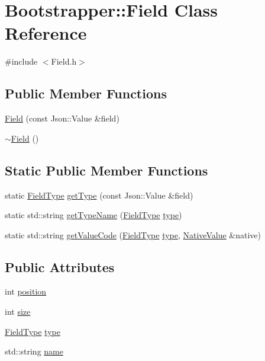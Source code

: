\hypertarget{classBootstrapper_1_1Field}{}\section{Bootstrapper\+:\+:Field Class Reference}
\label{classBootstrapper_1_1Field}


{\ttfamily \#include $<$Field.\+h$>$}

\subsection*{Public Member Functions}
\begin{DoxyCompactItemize}
\item 
\hyperlink{classBootstrapper_1_1Field_abd088815820d4e09209371878fcdb5b9}{Field} (const Json\+::\+Value \&field)
\item 
\hyperlink{classBootstrapper_1_1Field_a0f82fdaf05566ab8553b76fd8b5f81b1}{$\sim$\+Field} ()
\end{DoxyCompactItemize}
\subsection*{Static Public Member Functions}
\begin{DoxyCompactItemize}
\item 
static \hyperlink{namespaceBootstrapper_abb268c54c14e352b0204f5f0f928955f}{Field\+Type} \hyperlink{classBootstrapper_1_1Field_a3645ec61d64aad4f836ab87ce55d7fce}{get\+Type} (const Json\+::\+Value \&field)
\item 
static std\+::string \hyperlink{classBootstrapper_1_1Field_ab88f0ac745d4aca91713f46d669a3e2c}{get\+Type\+Name} (\hyperlink{namespaceBootstrapper_abb268c54c14e352b0204f5f0f928955f}{Field\+Type} \hyperlink{classBootstrapper_1_1Field_a3b51be0dcd155bb84173f1a73596d963}{type})
\item 
static std\+::string \hyperlink{classBootstrapper_1_1Field_a95c450dfe9ecedd662bdf07c6ed1d2d8}{get\+Value\+Code} (\hyperlink{namespaceBootstrapper_abb268c54c14e352b0204f5f0f928955f}{Field\+Type} \hyperlink{classBootstrapper_1_1Field_a3b51be0dcd155bb84173f1a73596d963}{type}, \hyperlink{unionNativeValue}{Native\+Value} \&native)
\end{DoxyCompactItemize}
\subsection*{Public Attributes}
\begin{DoxyCompactItemize}
\item 
int \hyperlink{classBootstrapper_1_1Field_a0c0b21db786e8e7463906fb18466f119}{position}
\item 
int \hyperlink{classBootstrapper_1_1Field_af0d0093eaaf445b55a91f12b33174442}{size}
\item 
\hyperlink{namespaceBootstrapper_abb268c54c14e352b0204f5f0f928955f}{Field\+Type} \hyperlink{classBootstrapper_1_1Field_a3b51be0dcd155bb84173f1a73596d963}{type}
\item 
std\+::string \hyperlink{classBootstrapper_1_1Field_abd1494c46c02219a339bf1a4c33d7763}{name}
\end{DoxyCompactItemize}


